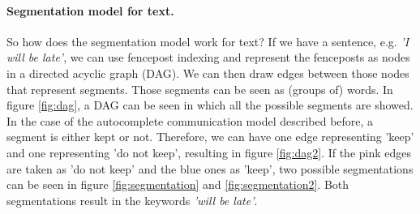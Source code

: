 \documentclass[a4paper, 12pt]{report}
\begin{document}
\paragraph{Segmentation model for text.}
So how does the segmentation model work for text? 
If we have a sentence, e.g. \textit{'I will be late'}, we can use fencepost indexing and represent the fenceposts as nodes in a directed acyclic graph (DAG). 
We can then draw edges between those nodes that represent segments. 
Those segments can be seen as (groups of) words. 
In figure \ref{fig:dag}, a DAG can be seen in which all the possible segments are showed. 
In the case of the autocomplete communication model described before, a segment is either kept or not.
Therefore, we can have one edge representing 'keep' and one representing 'do not keep', resulting in figure \ref{fig:dag2}.
If the pink edges are taken as 'do not keep' and the blue ones as 'keep', two possible segmentations can be seen in figure \ref{fig:segmentation} and \ref{fig:segmentation2}. 
Both segmentations result in the keywords \textit{'will be late'}. 
\end{document}
